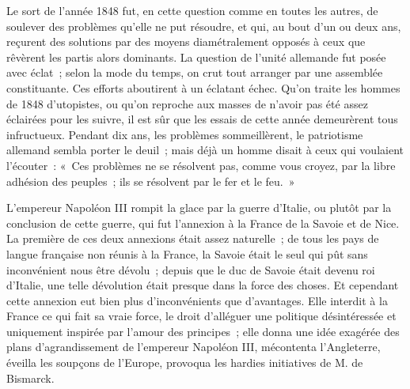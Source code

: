 \documentclass[french,twoside]{book} %
\begin{document}
Le sort de l’année 1848 fut, en cette question comme en toutes les autres, de soulever des problèmes qu’elle ne put résoudre, et qui, au bout d’un ou deux ans, reçurent des solutions par des moyens diamétralement opposés à ceux que rêvèrent les partis alors dominants. La question de l’unité allemande fut posée avec éclat ; selon la mode du temps, on crut tout arranger par une assemblée constituante. Ces efforts aboutirent à un éclatant échec. Qu’on traite les hommes de 1848 d’utopistes, ou qu’on reproche aux masses de n’avoir pas été assez éclairées pour les suivre, il est sûr que les essais de cette année demeurèrent tous infructueux. Pendant dix ans, les problèmes sommeillèrent, le patriotisme allemand sembla porter le deuil ; mais déjà un homme disait à ceux qui voulaient l’écouter : « Ces problèmes ne se résolvent pas, comme vous croyez, par la libre adhésion des peuples ; ils se résolvent par le fer et le feu. »\par
L’empereur Napoléon III rompit la glace par la guerre d’Italie, ou plutôt par la conclusion de cette guerre, qui fut l’annexion à la France de la Savoie et de Nice. La première de ces deux annexions était assez naturelle ; de tous les pays de langue française non réunis à la France, la Savoie était le seul qui pût sans inconvénient nous être dévolu ; depuis que le duc de Savoie était devenu roi d’Italie, une telle dévolution était presque dans la force des choses. Et cependant cette annexion eut bien plus d’inconvénients que d’avantages. Elle interdit à la France ce qui fait sa vraie force, le droit d’alléguer une politique désintéressée et uniquement inspirée par l’amour des principes ; elle donna une idée exagérée des plans d’agrandissement de l’empereur Napoléon III, mécontenta l’Angleterre, éveilla les soupçons de l’Europe, provoqua les hardies initiatives de M. de Bismarck.\par
\end{document}
